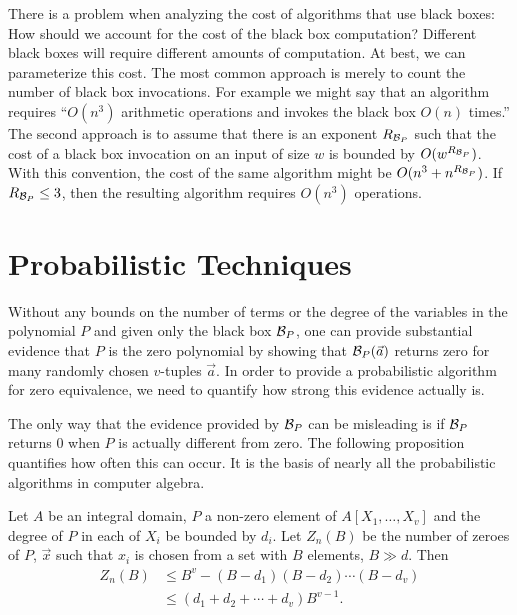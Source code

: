 There is a problem when analyzing the cost of algorithms that use
black boxes: How should we account for the cost of the black box
computation?  Different black boxes will require different amounts of
computation.  At best, we can parameterize this cost.  The most common
approach is merely to count the number of black box invocations.  For
example we might say that an algorithm requires ``$O(n^3)$ arithmetic
operations and invokes the black box $O(n)$ times.''  The second
approach is to assume that there is an exponent $R_{{\cal B}_P}$ such
that the cost of a black box invocation on an input of size $w$ is
bounded by $O(w^{R_{{\cal B}_P}})$.  With this convention, the cost of the
same algorithm might be $O(n^3 + n^{R_{{\cal B}_P}})$.  If $R_{{\cal B}_P} \le 3$,
then the resulting algorithm requires $O(n^3)$ operations. 


\section{Probabilistic Techniques}
\label{Zero:Probabilistic:Sec}

Without any bounds on the number of terms or the degree of the
variables in the polynomial $P$ and given only the black box ${\cal
B}_P$, one can provide substantial evidence that $P$ is the zero
polynomial by showing that ${\cal B}_P(\vec{a})$ returns zero for many
randomly chosen $v$-tuples $\vec{a}$.  In order to provide a
probabilistic algorithm for zero equivalence, we need to quantify how
strong this evidence actually is.

The only way that the evidence provided by ${\cal B}_P$ can be
misleading is if ${\cal B}_P$ returns $0$ when $P$ is actually
different from zero.  The following proposition quantifies how often
this can occur. It is the basis of nearly all the probabilistic
algorithms in computer algebra.

\begin{proposition}\label{Prob:Zero:Prop}
Let $A$ be an integral domain, $P$ a non-zero element of
$A[X_1,\ldots, X_v]$ and the degree of $P$ in each of $X_i$ be bounded
by $d_i$.  Let $Z_n(B)$ be the number of zeroes of $P$, $\vec{x}$ such
that $x_i$ is chosen from a set with $B$ elements, $B \gg d$.  Then
\[
\begin{aligned}
  Z_n(B) &\le B^v - (B-d_1)(B-d_2) \cdots (B-d_v)\\
    & \le (d_1 + d_2 + \cdots + d_v) B^{v-1}.
\end{aligned}
\]
\end{proposition}

